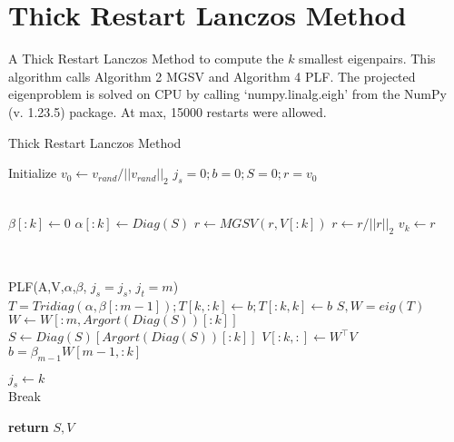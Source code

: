 \documentclass[a4paper]{article}
\begin{document}
\pagebreak

\section{Thick Restart Lanczos Method}
A Thick Restart Lanczos Method to compute the $k$ smallest eigenpairs. This algorithm calls Algorithm 2 MGSV and Algorithm 4 PLF. The projected eigenproblem is solved on CPU by calling ‘numpy.linalg.eigh’ from the NumPy (v. 1.23.5) package. At max, 15000 restarts were allowed.


\begin{algorithm}
\caption{Thick Restart Lanczos Method}\label{alg:TRLM}
\begin{algorithmic}[1]
\State Initialize $v_0 \gets v_{rand}/||v_{rand}||_2 $
\State $j_s = 0; b = 0; S = 0; r = v_0$

        \\
        \State $\beta[:k] \gets 0$
        \State $\alpha[:k] \gets Diag(S)$
        \State $r \gets MGSV(r,V[:k])$
        \State $r \gets r / ||r||_2$
        \State $v_k \gets r$

        \\
        
        \State PLF(A,V,$\alpha$,$\beta$, $j_s = j_s$, $j_t = m$) 
        \\
        \State $T = Tridiag(\alpha,\beta[:m-1]); T[k,:k] \gets b; T[:k,k] \gets b$
        \State $S,W = eig(T)$
        \State $W \gets W[:m,Argort(Diag(S))[:k]]$
        \State $S \gets Diag(S)[Argort(Diag(S))[:k]]$
        \State $V[:k,:] \gets W^\top V$
        \State $b = \beta_{m-1} W[m-1, :k]$ 
        
        \State $j_s \gets k$ 
        \\
            \State Break
        \EndIf
        
        
\EndFor



\State \textbf{return} $S, V$

\EndProcedure
\end{algorithmic}
\end{algorithm}
\end{document}
